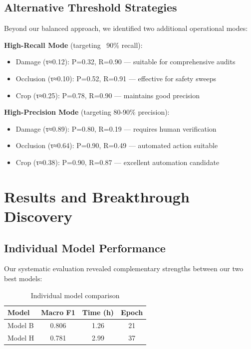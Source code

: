 \documentclass[12pt,twocolumn]{article}
\begin{document}
\subsection{Alternative Threshold Strategies}

Beyond our balanced approach, we identified two additional operational modes:

\textbf{High-Recall Mode} (targeting ~90\% recall):
\begin{itemize}[itemsep=1pt,parsep=0pt,topsep=2pt]
\item Damage (τ≈0.12): P=0.32, R=0.90 — suitable for comprehensive audits
\item Occlusion (τ≈0.10): P=0.52, R=0.91 — effective for safety sweeps
\item Crop (τ≈0.25): P=0.78, R=0.90 — maintains good precision
\end{itemize}

\textbf{High-Precision Mode} (targeting 80-90\% precision):
\begin{itemize}[itemsep=1pt,parsep=0pt,topsep=2pt]
\item Damage (τ≈0.89): P=0.80, R=0.19 — requires human verification
\item Occlusion (τ≈0.64): P=0.90, R=0.49 — automated action suitable
\item Crop (τ≈0.38): P=0.90, R=0.87 — excellent automation candidate
\end{itemize}

\section{Results and Breakthrough Discovery}

\subsection{Individual Model Performance}

Our systematic evaluation revealed complementary strengths between our two best models:

\begin{table}[!h]
\centering
\footnotesize
\begin{tabular}{lccc}
\toprule
\textbf{Model} & \textbf{Macro F1} & \textbf{Time (h)} & \textbf{Epoch} \\
\midrule
Model B & 0.806 & 1.26 & 21 \\
Model H & 0.781 & 2.99 & 37 \\
\bottomrule
\end{tabular}
\caption{Individual model comparison}
\end{table}
\end{document}
